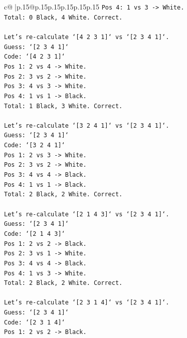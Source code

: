 \documentclass{article}
\begin{document}
{\begin{supertabular}{c@{$\;$}|p{.15\linewidth}@{}p{.15\linewidth}p{.15\linewidth}p{.15\linewidth}p{.15\linewidth}p{.15\linewidth}}
{{{\texttt{Pos 4: 1 vs 3 {-}> White.} \\
\texttt{Total: 0 Black, 4 White. Correct.} \\
\\ 
\texttt{Let's re{-}calculate `{[}4 2 3 1{]}` vs `{[}2 3 4 1{]}`.} \\
\texttt{Guess: `{[}2 3 4 1{]}`} \\
\texttt{Code: `{[}4 2 3 1{]}`} \\
\texttt{Pos 1: 2 vs 4 {-}> White.} \\
\texttt{Pos 2: 3 vs 2 {-}> White.} \\
\texttt{Pos 3: 4 vs 3 {-}> White.} \\
\texttt{Pos 4: 1 vs 1 {-}> Black.} \\
\texttt{Total: 1 Black, 3 White. Correct.} \\
\\ 
\texttt{Let's re{-}calculate `{[}3 2 4 1{]}` vs `{[}2 3 4 1{]}`.} \\
\texttt{Guess: `{[}2 3 4 1{]}`} \\
\texttt{Code: `{[}3 2 4 1{]}`} \\
\texttt{Pos 1: 2 vs 3 {-}> White.} \\
\texttt{Pos 2: 3 vs 2 {-}> White.} \\
\texttt{Pos 3: 4 vs 4 {-}> Black.} \\
\texttt{Pos 4: 1 vs 1 {-}> Black.} \\
\texttt{Total: 2 Black, 2 White. Correct.} \\
\\ 
\texttt{Let's re{-}calculate `{[}2 1 4 3{]}` vs `{[}2 3 4 1{]}`.} \\
\texttt{Guess: `{[}2 3 4 1{]}`} \\
\texttt{Code: `{[}2 1 4 3{]}`} \\
\texttt{Pos 1: 2 vs 2 {-}> Black.} \\
\texttt{Pos 2: 3 vs 1 {-}> White.} \\
\texttt{Pos 3: 4 vs 4 {-}> Black.} \\
\texttt{Pos 4: 1 vs 3 {-}> White.} \\
\texttt{Total: 2 Black, 2 White. Correct.} \\
\\ 
\texttt{Let's re{-}calculate `{[}2 3 1 4{]}` vs `{[}2 3 4 1{]}`.} \\
\texttt{Guess: `{[}2 3 4 1{]}`} \\
\texttt{Code: `{[}2 3 1 4{]}`} \\
\texttt{Pos 1: 2 vs 2 {-}> Black.} \\
}}}
\end{supertabular}}
\end{document}
